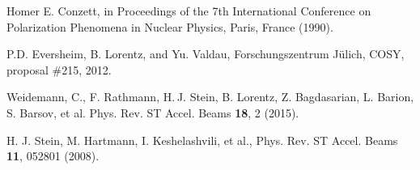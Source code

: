 \documentclass[reprint, superscriptaddress]{revtex4-1}
\begin{document}
\begin{thebibliography}{9}
Homer E. Conzett, in Proceedings of the 7th International Conference on Polarization Phenomena in Nuclear Physics, Paris, France (1990).

P.D. Eversheim, B. Lorentz, and Yu. Valdau, Forschungszentrum J\"ulich, COSY, proposal \#215, 2012.

Weidemann, C., F. Rathmann, H. J. Stein, B. Lorentz, Z. Bagdasarian, L. Barion, S. Barsov, et al. Phys. Rev. ST Accel. Beams \textbf{18}, 2 (2015).


H. J. Stein, M. Hartmann, I. Keshelashvili, et al., Phys. Rev. ST Accel. Beams \textbf{11}, 052801 (2008).

\end{thebibliography}
\end{document}
